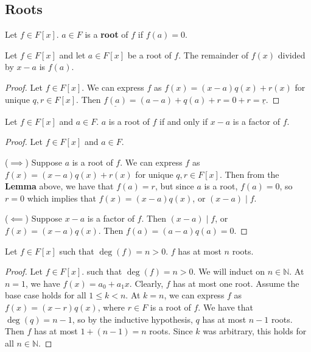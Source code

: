\documentclass [12pt] {article}
\newcommand{\N}{\mathbb{N}}
\newenvironment{definition}[1]{\begin{tcolorbox}[title={Definition: #1},colback=blue!5!white,colframe=black!75!blue]}{\end{tcolorbox}}
\newenvironment{theorem}[1]{\begin{tcolorbox}[title={Theorem #1},colback=green!5!white,colframe=black!75!green]}{\end{tcolorbox}}
\newenvironment{corollary}[1]{\begin{tcolorbox}[title={Corollary #1}]}{\end{tcolorbox}}
\newenvironment{lemma}[1]{\begin{tcolorbox}[title={Lemma #1}]}{\end{tcolorbox}}
\renewcommand{\bf}[1]{\textbf{{#1}}}
\newcommand{\ul}[1]{\underline{{#1}}}
\begin{document}
\newpage
\subsection{Roots}
\begin{definition}{Root}
    Let $f \in F[x]$. $a \in F$ is a \bf{root} of $f$ if $f(a) = 0$.
\end{definition}

\begin{lemma}{}
    Let $f \in F[x]$ and let $a \in F[x]$ be a root of $f$. The remainder of $f(x)$ divided by
    $x - a$ is $f(a)$.
\end{lemma}
\begin{proof}
    Let $f \in F[x]$. We can express $f$ as $f(x) = (x - a)q(x) + r(x)$ for unique $q, r \in F[x]$.
    Then $\ul{f(a)} = (a - a) + q(a) + r = 0 + r = \ul{r}$.
\end{proof}

\begin{theorem}{}
    Let $f \in F[x]$ and $a \in F$. $a$ is a root of $f$ if and only if $x - a$ is a factor of $f$.
\end{theorem}
\begin{proof}
    Let $f \in F[x]$ and $a \in F$.
    \vspace{0.5em}

    ($\implies$)
    Suppose $a$ is a root of $f$. We can express $f$ as $f(x) = (x - a)q(x) + r(x)$ for unique
    $q, r \in F[x]$. Then from the \bf{Lemma} above, we have that $f(a) = r$, but since $a$ is a
    root, $f(a) = 0$, so $r = 0$ which implies that $f(x) = (x - a)q(x)$, or $(x - a) \mid f$.
    \vspace{0.5em}

    ($\impliedby$)
    Suppose $x - a$ is a factor of $f$. Then $(x - a) \mid f$, or $f(x) = (x - a)q(x)$. Then
    $f(a) = (a - a)q(a) = 0$.
\end{proof}

\begin{corollary}{}
    Let $f \in F[x]$ such that $\deg(f) = n > 0$. $f$ has at most $n$ roots.
\end{corollary}
\begin{proof}
    Let $f \in F[x]$. such that $\deg(f) = n > 0$. We will induct on $n \in \N$. At $n = 1$, we have
    $f(x) = a_0 + a_1x$. Clearly, $f$ has at most one root. Assume the base case holds for all
    $1 \leq k < n$. At $k = n$, we can express $f$ as $f(x) = (x - r)q(x)$, where $r \in F$ is a root
    of $f$. We have that $\deg(q) = n - 1$, so by the inductive hypothesis, $q$ has at most $n - 1$
    roots. Then $f$ has at most $1 + (n - 1) = n$ roots. Since $k$ was arbitrary, this holds for all
    $n \in \N$.
\end{proof}
\end{document}
